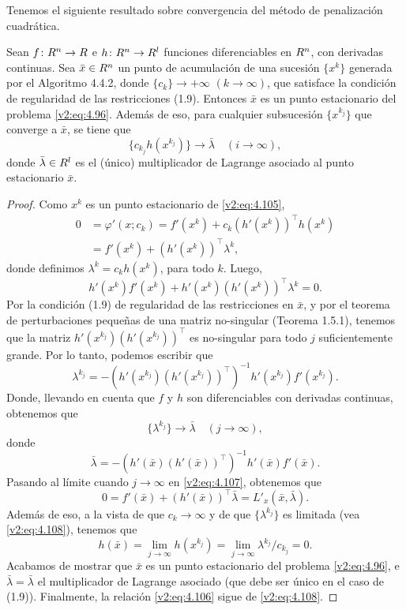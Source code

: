 Tenemos el siguiente resultado sobre convergencia del método de penalización cuadrática.

\begin{theorem}\label{v2:thm:4.4.2}
    Sean $f \colon R^n \to R$ e $h \colon R^n \to R^l$ funciones diferenciables en $R^n$, con derivadas continuas. Sea $\bar{x} \in R^n$ un punto de acumulación de una sucesión $\{x^k\}$ generada por el Algoritmo 4.4.2, donde $\{c_k\} \to +\infty$ $(k \to \infty)$, que satisface la condición de regularidad de las restricciones (1.9).
    Entonces $\bar{x}$ es un punto estacionario del problema \eqref{v2:eq:4.96}. Además de eso, para cualquier subsucesión $\{x^{k_j}\}$ que converge a $\bar{x}$, se tiene que
    \begin{equation}
        \{c_{k_j} h(x^{k_j})\} \to \bar{\lambda} \quad (i \to \infty),
        \label{v2:eq:4.106}
    \end{equation}
    donde $\bar{\lambda} \in R^l$ es el (único) multiplicador de Lagrange asociado al punto estacionario $\bar{x}$.
\end{theorem}
\begin{proof}
    Como $x^k$ es un punto estacionario de \eqref{v2:eq:4.105},
    \begin{align}
        0 &= \varphi'(x; c_k) = f'(x^k) + c_k(h'(x^k))^\top h(x^k) \nonumber \\
        &= f'(x^k) + (h'(x^k))^\top \lambda^k,
        \label{v2:eq:4.107}
    \end{align}
    donde definimos $\lambda^k = c_k h(x^k)$, para todo $k$. Luego,
    \[
        h'(x^k)f'(x^k) + h'(x^k)(h'(x^k))^\top \lambda^k = 0.
    \]
    Por la condición (1.9) de regularidad de las restricciones en $\bar{x}$, y por el teorema de perturbaciones pequeñas de una matriz no-singular (Teorema 1.5.1), tenemos que la matriz $h'(x^{k_j})(h'(x^{k_j}))^\top$ es no-singular para todo $j$ suficientemente grande. Por lo tanto, podemos escribir que
    \[
        \lambda^{k_j} = -(h'(x^{k_j})(h'(x^{k_j}))^\top)^{-1} h'(x^{k_j}) f'(x^{k_j}).
    \]
    Donde, llevando en cuenta que $f$ y $h$ son diferenciables con derivadas continuas, obtenemos que
    \begin{equation}
        \{\lambda^{k_j}\} \to \bar{\lambda} \quad (j \to \infty),
        \label{v2:eq:4.108}
    \end{equation}
    donde
    \[
        \bar{\lambda} = -(h'(\bar{x})(h'(\bar{x}))^\top)^{-1} h'(\bar{x}) f'(\bar{x}).
    \]
    Pasando al límite cuando $j \to \infty$ en \eqref{v2:eq:4.107}, obtenemos que
    \[
        0 = f'(\bar{x}) + (h'(\bar{x}))^\top \bar{\lambda} = L'_x(\bar{x}, \bar{\lambda}).
    \]
    Además de eso, a la vista de que $c_k \to \infty$ y de que $\{\lambda^{k_j}\}$ es limitada (vea \eqref{v2:eq:4.108}), tenemos que
    \[
        h(\bar{x}) = \lim_{j \to \infty} h(x^{k_j}) = \lim_{j \to \infty} \lambda^{k_j}/c_{k_j} = 0.
    \]
    Acabamos de mostrar que $\bar{x}$ es un punto estacionario del problema \eqref{v2:eq:4.96}, e $\bar{\lambda} = \bar{\lambda}$ el multiplicador de Lagrange asociado (que debe ser único en el caso de (1.9)). Finalmente, la relación \eqref{v2:eq:4.106} sigue de \eqref{v2:eq:4.108}.
\end{proof}

